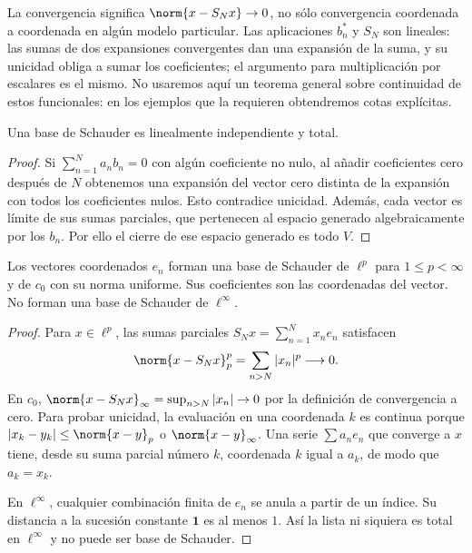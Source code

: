 La convergencia significa $\norm{x-S_Nx}\to0$, no sólo convergencia coordenada a coordenada en algún modelo particular. Las aplicaciones $b_n^*$ y $S_N$ son lineales: las sumas de dos expansiones convergentes dan una expansión de la suma, y su unicidad obliga a sumar los coeficientes; el argumento para multiplicación por escalares es el mismo. No usaremos aquí un teorema general sobre continuidad de estos funcionales: en los ejemplos que la requieren obtendremos cotas explícitas.

\begin{proposicion}\label{ampl:schauder-independencia}
Una base de Schauder es linealmente independiente y total.
\end{proposicion}
\begin{proof}
Si $\sum_{n=1}^Na_nb_n=0$ con algún coeficiente no nulo, al añadir coeficientes cero después de $N$ obtenemos una expansión del vector cero distinta de la expansión con todos los coeficientes nulos. Esto contradice unicidad. Además, cada vector es límite de sus sumas parciales, que pertenecen al espacio generado algebraicamente por los $b_n$. Por ello el cierre de ese espacio generado es todo $V$.
\end{proof}

\begin{proposicion}\label{ampl:schauder-coordenadas}
Los vectores coordenados $e_n$ forman una base de Schauder de $\ell^p$ para $1\le p<\infty$ y de $c_0$ con su norma uniforme. Sus coeficientes son las coordenadas del vector. No forman una base de Schauder de $\ell^\infty$.
\end{proposicion}
\begin{proof}
Para $x\in\ell^p$, las sumas parciales $S_Nx=\sum_{n=1}^Nx_ne_n$ satisfacen
\[
 \norm{x-S_Nx}_p^p=\sum_{n>N}|x_n|^p\longrightarrow0.
\]
En $c_0$, $\norm{x-S_Nx}_\infty=\sup_{n>N}|x_n|\to0$ por la definición de convergencia a cero. Para probar unicidad, la evaluación en una coordenada $k$ es continua porque $|x_k-y_k|\le\norm{x-y}_p$ o $\norm{x-y}_\infty$. Una serie $\sum a_ne_n$ que converge a $x$ tiene, desde su suma parcial número $k$, coordenada $k$ igual a $a_k$, de modo que $a_k=x_k$.

En $\ell^\infty$, cualquier combinación finita de $e_n$ se anula a partir de un índice. Su distancia a la sucesión constante $\mathbf1$ es al menos $1$. Así la lista ni siquiera es total en $\ell^\infty$ y no puede ser base de Schauder.
\end{proof}

